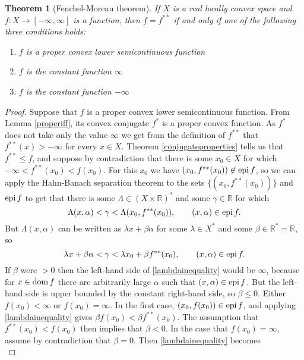 \documentclass{article}
\newcommand{\epi}{\ensuremath\mathrm{epi}\,}
\newcommand{\dom}{\ensuremath\mathrm{dom}\,}
\newtheorem{theorem}{Theorem}
\theoremstyle{definition}
\begin{document}
\begin{theorem}[Fenchel-Moreau theorem]
If $X$ is a real locally convex space and $f:X \to [-\infty,\infty]$ is a function, then $f=f^{**}$ if and only if one of the following three conditions holds:
\begin{enumerate}
\item $f$ is a proper convex lower semicontinuous function
\item $f$ is the constant function $\infty$
\item $f$ is the constant function $-\infty$
\end{enumerate}
\end{theorem}
\begin{proof}
Suppose that $f$ is a proper convex lower semicontinuous function. From Lemma  \ref{properiff}, its convex conjugate $f^*$ is a proper convex
function. 
As $f^*$ does not take only the value $\infty$  we get from the definition of $f^{**}$  that $f^{**}(x) > -\infty$ for every $x \in X$.
Theorem \ref{conjugateproperties} tells us that $f^{**} \leq f$, and suppose by contradiction that there is some
$x_0 \in X$ for which $-\infty<f^{**}(x_0) < f(x_0)$.
For this $x_0$ we have $(x_0,f^{**}(x_0)) \not \in \epi f$, so we can apply the Hahn-Banach separation theorem to the sets
$\{(x_0,f^{**}(x_0))\}$ and $\epi f$ to get that there is some $\Lambda \in (X \times \mathbb{R})^*$ and some $\gamma \in \mathbb{R}$
for which
\[
 \Lambda (x,\alpha) < \gamma <  \Lambda (x_0,f^{**}(x_0)) , \qquad (x,\alpha) \in \epi f.
\]
But $\Lambda (x,\alpha)$ can be written as $\lambda x + \beta \alpha$ for some $\lambda \in X^*$ and some $\beta \in \mathbb{R}^*=\mathbb{R}$, so 
\begin{equation}
\lambda x + \beta \alpha < \gamma < \lambda x_0 + \beta f^{**}(x_0), \qquad (x,\alpha) \in \epi f.
\label{lambdainequality}
\end{equation}
If $\beta$ were $>0$ then the left-hand side of \eqref{lambdainequality} would be $\infty$, because for $x \in \dom f$ there are arbitrarily large $\alpha$ such that
$(x,\alpha) \in \epi f$.  But the left-hand side is upper bounded by
the constant right-hand side, so  $\beta \leq 0$. 
Either $f(x_0)<\infty$ or $f(x_0)=\infty$. In the first case, $(x_0,f(x_0)) \in \epi f$, and applying \eqref{lambdainequality}
gives $\beta f(x_0) < \beta f^{**}(x_0)$. The assumption that $f^{**}(x_0)<f(x_0)$ then implies that $\beta<0$.
In the case that $f(x_0)=\infty$,  assume by contradiction that $\beta=0$. 
Then \eqref{lambdainequality} becomes
\begin{equation}

\end{equation}
\end{proof}
\end{document}
